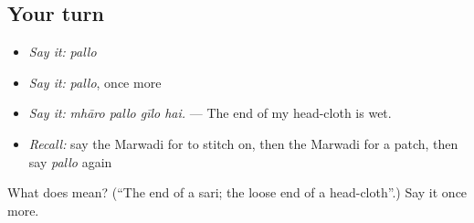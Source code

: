 \subsection*{Your turn}
\begin{itemize}
\raggedright
  \item \emph{Say it:} \emph{pallo}
  \item \emph{Say it:} \emph{pallo}, once more
  \item \emph{Say it:} \emph{mhāro pallo gīlo hai.} — The end of my head-cloth is wet.
  \item \emph{Recall:} say the Marwadi for to stitch on, then the Marwadi for a patch, then say \emph{pallo} again
\end{itemize}

\begin{tcolorbox}[breakable,colback=teal!4,colframe=teal!35!black,title={Before you move on}]
What does  mean? (\textquotedblleft{}The end of a sari; the loose end of a head-cloth\textquotedblright{}.) Say it once more.
\end{tcolorbox}
